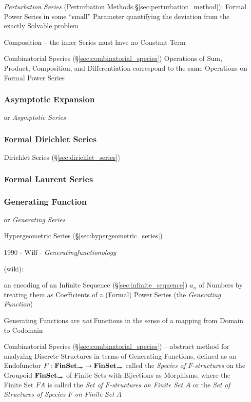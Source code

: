 \fist \emph{Perturbation Series} (Perturbation Methods
\S\ref{sec:perturbation_method}): Formal Power Series in some ``small''
Parameter quantifying the deviation from the exactly Solvable problem

Composition -- the inner Series must have no Constant Term

Combinatorial Species (\S\ref{sec:combinatorial_species}) Operations of Sum,
Product, Composition, and Differentiation correspond to the same Operations on
Formal Power Series



\subsubsection{Asymptotic Expansion}\label{sec:asymptotic_expansion}

or \emph{Asymptotic Series}



\subsubsection{Formal Dirichlet Series}\label{sec:formal_dirichlet_series}

Dirichlet Series (\S\ref{sec:dirichlet_series})



\subsubsection{Formal Laurent Series}\label{sec:formal_laurent}

\subsubsection{Generating Function}\label{sec:generating_function}

or \emph{Generating Series}

Hypergeometric Series (\S\ref{sec:hypergeometric_series})

1990 - Wilf - \emph{Generatingfunctionology}

(wiki):

an encoding of an Infinite Sequence (\S\ref{sec:infinite_sequence}) $a_n$ of
Numbers by treating them as Coefficients of a (Formal) Power Series (the
\emph{Generating Function})

Generating Functions are \emph{not} Functions in the sense of a mapping from
Domain to Codomain

\fist Combinatorial Species (\S\ref{sec:combinatorial_species}) -- abstract
method for analyzing Discrete Structures in terms of Generating Functions,
defined as an Endofunctor $F : \mathbf{FinSet}_{\rightarrowtail\hspace{-8pt}\twoheadrightarrow} \rightarrow
\mathbf{FinSet}_{\rightarrowtail\hspace{-8pt}\twoheadrightarrow}$ called the \emph{Species of $F$-structures} on the
Groupoid $\mathbf{FinSet}_{\rightarrowtail\hspace{-8pt}\twoheadrightarrow}$ of Finite Sets with Bijections as Morphisms,
where the Finite Set $F A$ is called the \emph{Set of $F$-structures on Finite
  Set $A$} or the \emph{Set of Structures of Species $F$ on Finite Set $A$}

